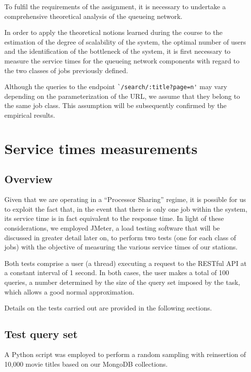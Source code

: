 To fulfil the requirements of the assignment, it is necessary to undertake a comprehensive theoretical analysis of the queueing network.

In order to apply the theoretical notions learned during the course to the estimation of the degree of scalability of the system, the optimal number of users and the identification of the bottleneck of the system, it is first necessary to measure the service times for the queueing network components with regard to the two classes of jobs previously defined.

Although the queries to the endpoint \verb|`/search/:title?page=n'| may vary depending on the parameterization of the URL, we assume that they belong to the same job class.
This assumption will be subsequently confirmed by the empirical results.

\section{Service times measurements}

\subsection{Overview}

Given that we are operating in a ``Processor Sharing'' regime, it is possible for us to exploit the fact that, in the event that there is only one job within the system, its service time is in fact equivalent to the response time.
In light of these considerations, we employed JMeter, a load testing software that will be discussed in greater detail later on, to perform two tests (one for each class of jobs) with the objective of measuring the various service times of our stations.

Both tests comprise a user (a thread) executing a request to the RESTful API at a constant interval of 1 second.
In both cases, the user makes a total of 100 queries, a number determined by the size of the query set imposed by the task, which allows a good normal approximation.

Details on the tests carried out are provided in the following sections.

\subsection{Test query set}

A Python script was employed to perform a random sampling with reinsertion of 10,000 movie titles based on our MongoDB collections.

